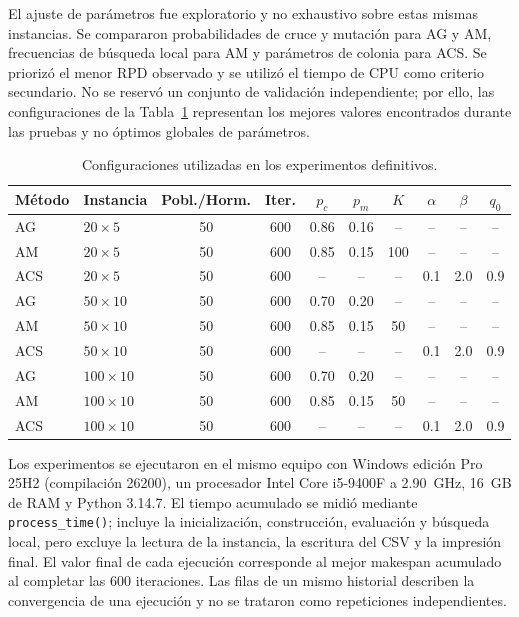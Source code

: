 \documentclass[journal]{IEEEtran}
\begin{document}
El ajuste de parámetros fue exploratorio y no exhaustivo sobre estas mismas instancias. Se compararon probabilidades de cruce y mutación para AG y AM, frecuencias de búsqueda local para AM y parámetros de colonia para ACS. Se priorizó el menor RPD observado y se utilizó el tiempo de CPU como criterio secundario. No se reservó un conjunto de validación independiente; por ello, las configuraciones de la Tabla~\ref{tab:configuracion} representan los mejores valores encontrados durante las pruebas y no óptimos globales de parámetros.

\begin{table}[t]
\caption{Configuraciones utilizadas en los experimentos definitivos.}
\label{tab:configuracion}
\centering
\footnotesize
\begin{tabular}{@{}llcccccccc@{}}
\toprule
Método & Instancia & Pobl./Horm. & Iter. & $p_c$ & $p_m$ & $K$ & $\alpha$ & $\beta$ & $q_0$\\
\midrule
AG  & $20\times5$   & 50 & 600 & 0.86 & 0.16 & --  & --  & --  & --\\
AM  & $20\times5$   & 50 & 600 & 0.85 & 0.15 & 100 & --  & --  & --\\
ACS & $20\times5$   & 50 & 600 & --   & --   & --  & 0.1 & 2.0 & 0.9\\
\midrule
AG  & $50\times10$  & 50 & 600 & 0.70 & 0.20 & --  & --  & --  & --\\
AM  & $50\times10$  & 50 & 600 & 0.85 & 0.15 & 50  & --  & --  & --\\
ACS & $50\times10$  & 50 & 600 & --   & --   & --  & 0.1 & 2.0 & 0.9\\
\midrule
AG  & $100\times10$ & 50 & 600 & 0.70 & 0.20 & --  & --  & --  & --\\
AM  & $100\times10$ & 50 & 600 & 0.85 & 0.15 & 50  & --  & --  & --\\
ACS & $100\times10$ & 50 & 600 & --   & --   & --  & 0.1 & 2.0 & 0.9\\
\bottomrule
\end{tabular}
\end{table}

Los experimentos se ejecutaron en el mismo equipo con Windows edición Pro 25H2 (compilación 26200), un procesador Intel Core i5-9400F a 2.90~GHz, 16~GB de RAM y Python 3.14.7. El tiempo acumulado se midió mediante \texttt{process\_time()}; incluye la inicialización, construcción, evaluación y búsqueda local, pero excluye la lectura de la instancia, la escritura del CSV y la impresión final. El valor final de cada ejecución corresponde al mejor makespan acumulado al completar las 600 iteraciones. Las filas de un mismo historial describen la convergencia de una ejecución y no se trataron como repeticiones independientes.
\end{document}
